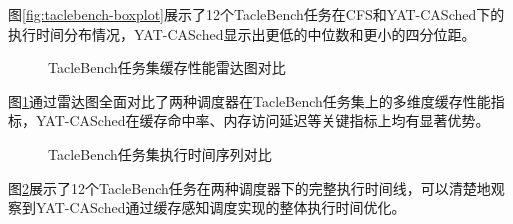 图\ref{fig:taclebench-boxplot}展示了12个TacleBench任务在CFS和YAT-CASched下的执行时间分布情况，YAT-CASched显示出更低的中位数和更小的四分位距。

\begin{figure}[H]
\centering
\caption{TacleBench任务集缓存性能雷达图对比}
\label{fig:taclebench-radar}
\end{figure}

图\ref{fig:taclebench-radar}通过雷达图全面对比了两种调度器在TacleBench任务集上的多维度缓存性能指标，YAT-CASched在缓存命中率、内存访问延迟等关键指标上均有显著优势。

\begin{figure}[H]
\centering
\caption{TacleBench任务集执行时间序列对比}
\label{fig:taclebench-timeline}
\end{figure}

图\ref{fig:taclebench-timeline}展示了12个TacleBench任务在两种调度器下的完整执行时间线，可以清楚地观察到YAT-CASched通过缓存感知调度实现的整体执行时间优化。







